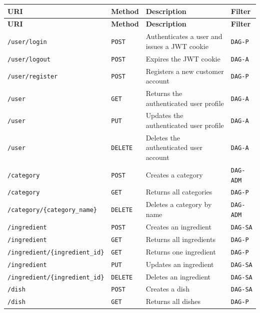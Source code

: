 \small
\begin{longtable}{|>{\raggedright\arraybackslash}p{}|>{\raggedright\arraybackslash}p{}|>{\raggedright\arraybackslash}p{}|>{\raggedright\arraybackslash}p{}|}
\hline
\textbf{URI} & \textbf{Method} & \textbf{Description} & \textbf{Filter} \\
\hline
\endfirsthead
\hline
\textbf{URI} & \textbf{Method} & \textbf{Description} & \textbf{Filter} \\
\hline
\endhead
\texttt{/user/login} & \texttt{POST} & Authenticates a user and issues a JWT cookie & \texttt{DAG-P} \\
\hline
\texttt{/user/logout} & \texttt{POST} & Expires the JWT cookie & \texttt{DAG-A} \\
\hline
\texttt{/user/register} & \texttt{POST} & Registers a new customer account & \texttt{DAG-P} \\
\hline
\texttt{/user} & \texttt{GET} & Returns the authenticated user profile & \texttt{DAG-A} \\
\hline
\texttt{/user} & \texttt{PUT} & Updates the authenticated user profile & \texttt{DAG-A} \\
\hline
\texttt{/user} & \texttt{DELETE} & Deletes the authenticated user account & \texttt{DAG-A} \\
\hline
\texttt{/category} & \texttt{POST} & Creates a category & \texttt{DAG-ADM} \\
\hline
\texttt{/category} & \texttt{GET} & Returns all categories & \texttt{DAG-P} \\
\hline
\texttt{/category/\{category\_name\}} & \texttt{DELETE} & Deletes a category by name & \texttt{DAG-ADM} \\
\hline
\texttt{/ingredient} & \texttt{POST} & Creates an ingredient & \texttt{DAG-SA} \\
\hline
\texttt{/ingredient} & \texttt{GET} & Returns all ingredients & \texttt{DAG-P} \\
\hline
\texttt{/ingredient/\{ingredient\_id\}} & \texttt{GET} & Returns one ingredient & \texttt{DAG-P} \\
\hline
\texttt{/ingredient} & \texttt{PUT} & Updates an ingredient & \texttt{DAG-SA} \\
\hline
\texttt{/ingredient/\{ingredient\_id\}} & \texttt{DELETE} & Deletes an ingredient & \texttt{DAG-SA} \\
\hline
\texttt{/dish} & \texttt{POST} & Creates a dish & \texttt{DAG-SA} \\
\hline
\texttt{/dish} & \texttt{GET} & Returns all dishes & \texttt{DAG-P} \\

\end{longtable}
